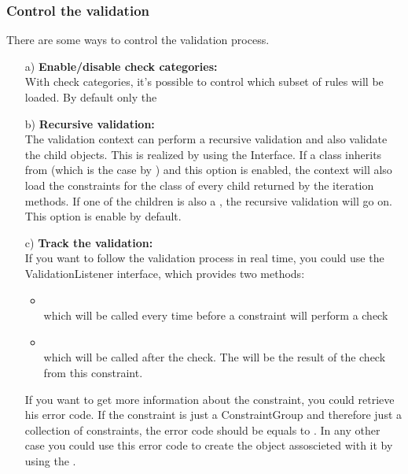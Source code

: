 \subsubsection{Control the validation}
There are some ways to control the validation process.
\begin{itemize}
\item[a)] \textbf{Enable/disable check categories:}\\
With check categories, it's possible to control which subset of rules will be loaded. By default only the 
\item[b)] \textbf{Recursive validation:}\\
The validation context can perform a recursive validation and also validate the child objects. This is realized by using the \TreeNode Interface. If a class inherits from \TreeNode (which is the case by \SBase) and this option is enabled, the context will also load the constraints for the class of every child returned by the \TreeNode iteration methods. If one of the children is also a \TreeNode, the recursive validation will go on. This option is enable by default.
\item[c)] \textbf{Track the validation:}\\
If you want to follow the validation process in real time, you could use the ValidationListener interface, which provides two methods:
\begin{itemize}
\item {} \\ 
which will be called every time before a constraint will perform a check
\item {} \\
which will be called after the check. The  will be the result of the check from this constraint.
\end{itemize}
If you want to get more information about the constraint, you could retrieve his error code. If the constraint is just a ConstraintGroup and therefore just a collection of constraints, the error code should be equals to . In any other case you could use this error code to create the  object assoscieted with it by using the .
\end{itemize}


